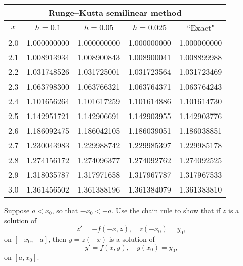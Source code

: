 \documentclass{ximera}
\begin{document}
\begin{problem}
\begin{solution}
{\small
\begin{tabular}{|c|r|r|r|r|}
\hline
\multicolumn{5}{|c|}{Runge--Kutta semilinear method}\\\hline
\multicolumn{1}{|c|}{$x$}&
\multicolumn{1}{|c|}{$h=0.1$}&
\multicolumn{1}{|c|}{$h=0.05$}&
\multicolumn{1}{|c|}{$h=0.025$}&
\multicolumn{1}{|c|}{``Exact"}\\ \hline
2.0 & 1.000000000 & 1.000000000 & 1.000000000 & 1.000000000 \\
2.1 & 1.008913934 & 1.008900843 & 1.008900041 & 1.008899988 \\
2.2 & 1.031748526 & 1.031725001 & 1.031723564 & 1.031723469 \\
2.3 & 1.063798300 & 1.063766321 & 1.063764371 & 1.063764243 \\
2.4 & 1.101656264 & 1.101617259 & 1.101614886 & 1.101614730 \\
2.5 & 1.142951721 & 1.142906691 & 1.142903955 & 1.142903776 \\
2.6 & 1.186092475 & 1.186042105 & 1.186039051 & 1.186038851 \\
2.7 & 1.230043983 & 1.229988742 & 1.229985397 & 1.229985178 \\
2.8 & 1.274156172 & 1.274096377 & 1.274092762 & 1.274092525 \\
2.9 & 1.318035787 & 1.317971658 & 1.317967787 & 1.317967533 \\
3.0 & 1.361456502 & 1.361388196 & 1.361384079 & 1.361383810 \\
\hline
\end{tabular}}
 \end{solution}
 \end{problem}

\begin{problem}\label{exer:3.3.23}
Suppose $a<x_0$, so that $-x_0<-a$.
Use the chain rule to show that if  $z$ is a solution of
$$
z'=-f(-x,z),\quad z(-x_0)=y_0,
$$
on $[-x_0,-a]$, then $y=z(-x)$ is a solution of
$$
y'=f(x,y),\quad y(x_0)=y_0,
$$
on $[a,x_0]$.
\end{problem}
\end{document}
